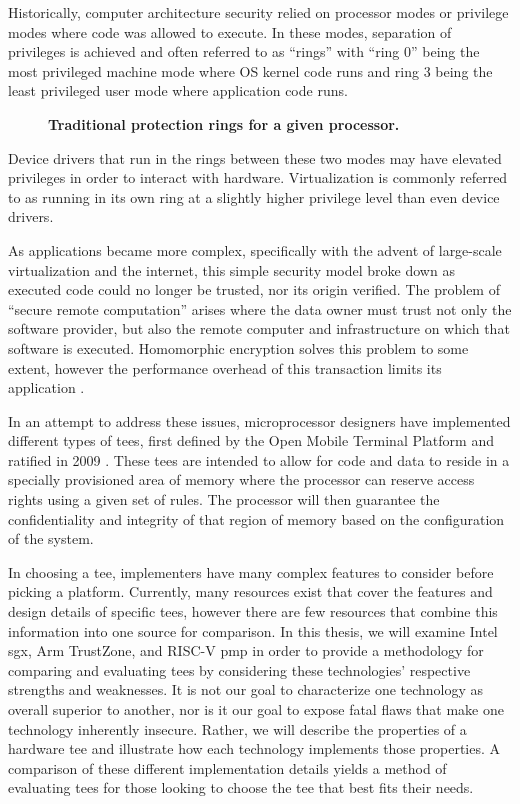 Historically, computer architecture security relied on processor modes or privilege modes where code was allowed to execute. In these modes, separation of privileges is achieved and often referred to as ``rings'' with ``ring 0'' being the most privileged machine mode where OS kernel code runs and ring 3 being the least privileged user mode where application code runs.

\begin{figure}[htbp]
\centering

\caption[Protection Rings]{\textbf{Traditional protection rings for a given processor.}}
\label{fig:rings}
\end{figure}

\noindent Device drivers that run in the rings between these two modes may have elevated privileges in order to interact with hardware. Virtualization is commonly referred to as running in its own ring at a slightly higher privilege level than even device drivers.  

As applications became more complex, specifically with the advent of large-scale virtualization and the internet, this simple security model broke down as executed code could no longer be trusted, nor its origin verified. The problem of ``secure remote computation'' arises where the data owner must trust not only the software provider, but also the remote computer and infrastructure on which that software is executed. Homomorphic encryption solves this problem to some extent, however the performance overhead of this transaction limits its application \cite{gentryPhd}.

In an attempt to address these issues, microprocessor designers have implemented different types of \glspl{tee}, first defined by the Open Mobile Terminal Platform and ratified in 2009 \cite{Confidential2009}. These \glspl{tee} are intended to allow for code and data to reside in a specially provisioned area of memory where the processor can reserve access rights using a given set of rules. The processor will then guarantee the confidentiality and integrity of that region of memory based on the configuration of the system.

In choosing a \gls{tee}, implementers have many complex features to consider before picking a platform. Currently, many resources exist that cover the features and design details of specific \glspl{tee}, however there are few resources that combine this information into one source for comparison. In this thesis, we will examine Intel \gls{sgx}, Arm TrustZone, and RISC-V \gls{pmp} in order to provide a methodology for comparing and evaluating \glspl{tee} by considering these technologies' respective strengths and weaknesses. It is not our goal to characterize one technology as overall superior to another, nor is it our goal to expose fatal flaws that make one technology inherently insecure. Rather, we will describe the properties of a hardware \gls{tee} and illustrate how each technology implements those properties. A comparison of these different implementation details yields a method of evaluating \glspl{tee} for those looking to choose the \gls{tee} that best fits their needs.

